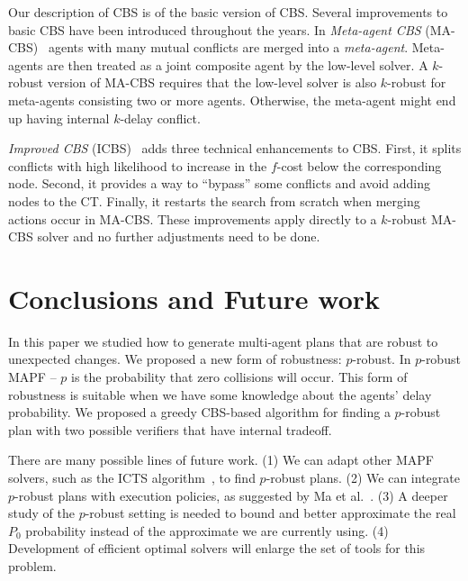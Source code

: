 \documentclass{article}
\begin{document}
Our description of CBS is of the basic version of CBS. Several improvements to basic CBS have been introduced throughout the years. In {\em Meta-agent CBS} (MA-CBS)~\cite{CBSJUR} agents with many mutual conflicts are merged into a {\em meta-agent}. Meta-agents are then treated as a joint composite agent by the low-level solver. A $k$-robust version of MA-CBS requires that the low-level solver is also $k$-robust for meta-agents consisting two or more agents. Otherwise, the meta-agent might end up having internal $k$-delay conflict.

{\em Improved CBS} (ICBS)~\cite{ICBS} adds three technical enhancements to CBS.
First, it splits conflicts with high likelihood to increase in the
$f$-cost below the corresponding node. Second, it provides a way to ``bypass'' some conflicts and avoid adding nodes to the CT. Finally, it restarts the search from scratch when merging actions occur in MA-CBS. These improvements apply directly to a $k$-robust MA-CBS solver and no further adjustments need to be done.
\fi


\section{Conclusions and Future work}



In this paper we studied how to generate multi-agent plans that are robust to unexpected changes. We proposed a new form of robustness: $p$-robust. In $p$-robust MAPF -- $p$ is the probability that zero collisions will occur. This form of robustness is suitable when we have some knowledge about the agents' delay probability. We proposed a greedy CBS-based algorithm for finding a $p$-robust plan with two possible verifiers that have internal tradeoff.

There are many possible lines of future work. 
(1) We can adapt other MAPF solvers, such as the ICTS algorithm~\cite{sharon2013increasing}, to find $p$-robust plans. 
(2) We can integrate $p$-robust plans with execution policies, as suggested by Ma et al.~. 
(3) A deeper study of the $p$-robust setting is needed to bound and better approximate the real $P_0$ probability instead of the approximate we are currently using. 
(4) Development of efficient optimal solvers will enlarge the set of tools for this problem.

\end{document}
